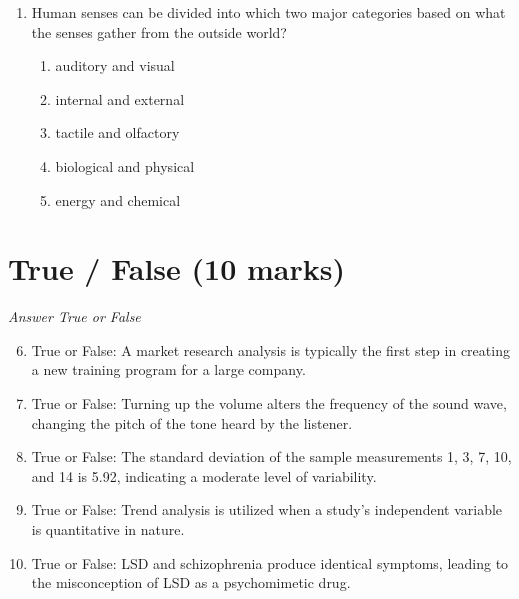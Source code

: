 \documentclass[12pt]{article}
\begin{document}
\begin{enumerate}[label=\arabic*.]
\begin{enumerate}[label=(\alph*)]
    \item cell body
    \item myelin
    \item synaptic vesicles
    \item glial cells
    \item terminal buttons
\end{enumerate}
\item Human senses can be divided into which two major categories based on what the senses gather from the outside world?
\begin{enumerate}[label=(\alph*)]
    \item auditory and visual
    \item internal and external
    \item tactile and olfactory
    \item biological and physical
    \item energy and chemical
\end{enumerate}
\end{enumerate}

\section*{True / False (10 marks)}
\textit{Answer True or False}
\begin{enumerate}[label=\arabic*.]
\setcounter{enumi}{5}
\item True or False: A market research analysis is typically the first step in creating a new training program for a large company.
\item True or False: Turning up the volume alters the frequency of the sound wave, changing the pitch of the tone heard by the listener.
\item True or False: The standard deviation of the sample measurements 1, 3, 7, 10, and 14 is 5.92, indicating a moderate level of variability.
\item True or False: Trend analysis is utilized when a study's independent variable is quantitative in nature.
\item True or False: LSD and schizophrenia produce identical symptoms, leading to the misconception of LSD as a psychomimetic drug.
\end{enumerate}
\end{document}
